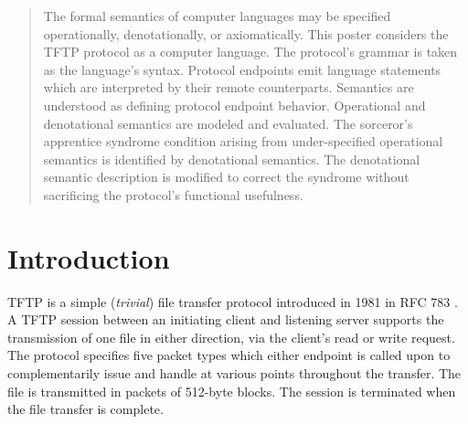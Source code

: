 \documentclass[a0,landscape]{a0poster}
\begin{document}
\begin{multicols}{4} %


\color{Navy} %

\begin{abstract}

The formal semantics of computer languages may be specified operationally, denotationally, or axiomatically. This poster considers the TFTP protocol as a computer language. The protocol's grammar is taken as the language's syntax. Protocol endpoints emit language statements which are interpreted by their remote counterparts. Semantics are understood as defining protocol endpoint behavior. Operational and denotational semantics are modeled and evaluated. The sorceror's apprentice syndrome condition arising from under-specified operational semantics is identified by denotational semantics. The denotational semantic description is modified to correct the syndrome without sacrificing the protocol's functional usefulness.

\end{abstract}


\color{SaddleBrown} %

\section*{Introduction}

TFTP is a simple (\textit{trivial}) file transfer protocol introduced in 1981 in RFC 783 \cite{Sollins:1983}.  A TFTP session between an initiating client and listening server supports the transmission of one file in either direction, via the client's read or write request. The protocol specifies five packet types which either endpoint is called upon to complementarily issue and handle at various points throughout the transfer. The file is transmitted in packets of 512-byte blocks. The session is terminated when the file transfer is complete.


\end{multicols}
\end{document}

